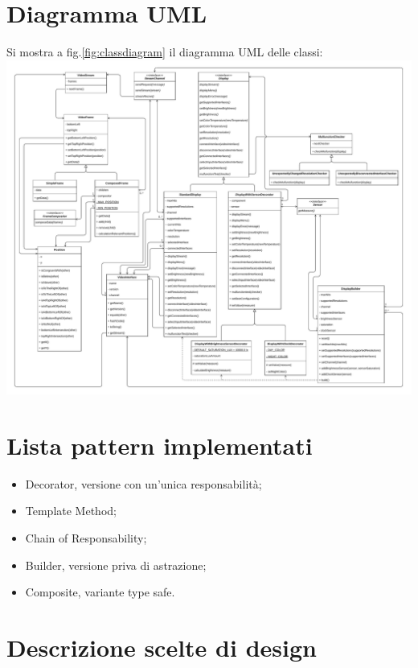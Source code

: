 \documentclass[a4paper,11pt]{article}
\begin{document}
	\section{Diagramma UML}
	Si mostra a fig.\ref{fig:classdiagram} il diagramma UML delle classi:\\
	\noindent\includegraphics[width=\textwidth]{diagramma/ClassDiagramm-NoTypes.pdf}
	\label{fig:classdiagram}
	
	\section{Lista pattern implementati}
	\begin{itemize}
		\item Decorator, versione con un'unica responsabilità;
		\item Template Method;
		\item Chain of Responsability;
		\item Builder, versione priva di astrazione;
		\item Composite, variante type safe.
	\end{itemize}
	\section{Descrizione scelte di design}
\end{document}
